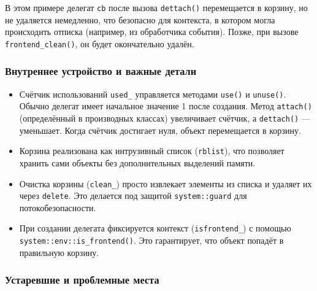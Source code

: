 \documentclass[a4paper,12pt]{article}
\begin{document}
В этом примере делегат \texttt{cb} после вызова \texttt{dettach()} перемещается в корзину, но не удаляется немедленно, что безопасно для контекста, в котором могла происходить отписка (например, из обработчика события). Позже, при вызове \texttt{frontend\_clean()}, он будет окончательно удалён.

\subsubsection{Внутреннее устройство и важные детали}

\begin{itemize}
    \item Счётчик использований \texttt{used\_} управляется методами \texttt{use()} и \texttt{unuse()}. Обычно делегат имеет начальное значение 1 после создания. Метод \texttt{attach()} (определённый в производных классах) увеличивает счётчик, а \texttt{dettach()} — уменьшает. Когда счётчик достигает нуля, объект перемещается в корзину.
    \item Корзина реализована как интрузивный список (\texttt{rblist}), что позволяет хранить сами объекты без дополнительных выделений памяти.
    \item Очистка корзины (\texttt{clean\_}) просто извлекает элементы из списка и удаляет их через \texttt{delete}. Это делается под защитой \texttt{system::guard} для потокобезопасности.
    \item При создании делегата фиксируется контекст (\texttt{isfrontend\_}) с помощью \texttt{system::env::is\_frontend()}. Это гарантирует, что объект попадёт в правильную корзину.
\end{itemize}

\subsubsection{Устаревшие и проблемные места}
\end{document}
